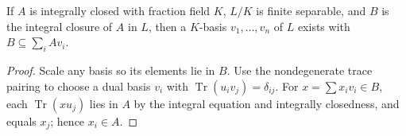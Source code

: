 \begin{proposition}
\label{am-prop-5-17}
\uses{}
If $A$ is integrally closed with fraction field $K$, $L/K$ is finite separable,
and $B$ is the integral closure of $A$ in $L$, then a $K$-basis
$v_1,\ldots,v_n$ of $L$ exists with $B\subseteq\sum_iAv_i$.
\end{proposition}
\begin{proof}
Scale any basis so its elements lie in $B$.  Use the nondegenerate trace pairing
to choose a dual basis $v_i$ with $\operatorname{Tr}(u_iv_j)=\delta_{ij}$.  For
$x=\sum x_iv_i\in B$, each $\operatorname{Tr}(xu_j)$ lies in $A$ by the
integral equation and integrally closedness, and equals $x_j$; hence $x_i\in A$.
\end{proof}

